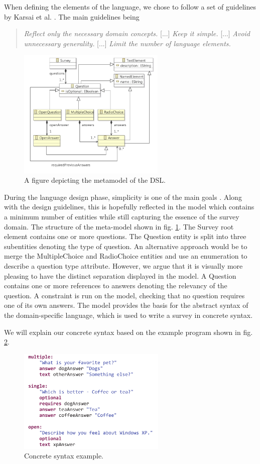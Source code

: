 \documentclass[runningheads]{llncs}
\begin{document}
When defining the elements of the language, we chose to follow a set of guidelines by Karsai et al. \cite{karsai}. The main guidelines being
\begin{quotation}
\emph{Reflect only the necessary domain concepts.} [...] \emph{Keep it simple.} [...] \emph{Avoid unnecessary generality.} [...] \emph{Limit the number of language elements.}
\end{quotation}
\begin{figure}[h]
\centering
 \includegraphics[height=6.2cm]{metamodel}
\caption{A figure depicting the metamodel of the DSL.}
\label{fig:mmod}
\end{figure}
During the language design phase, simplicity is one of the main goals \cite{karsai}. Along with the design guidelines, this is hopefully reflected in the model which contains a minimum number of entities while still capturing the essence of the survey domain.  
The structure of the meta-model shown in fig. \ref{fig:mmod}. The \textsf{Survey} root element contains one or more questions. The \textsf{Question} entity is split into three subentities denoting the type of question. An alternative approach would be to merge the \textsf{MultipleChoice} and \textsf{RadioChoice} entities and use an enumeration to describe a question type attribute. However, we argue that it is visually more pleasing to have the distinct separation displayed in the model. A \textsf{Question} contains one or more references to answers denoting the relevancy of the question. A constraint is run on the model, checking that no question requires one of its own answers. The model provides the basis for the abstract syntax of the domain-specific language, which is used to write a survey in concrete syntax. 

We will explain our concrete syntax based on the example program shown in fig. \ref{fig:concrete}.
\begin{figure}
\centering
\includegraphics[height=5cm]{concrete}
\caption{Concrete syntax example.}
\label{fig:concrete}
\end{figure}
\end{document}
